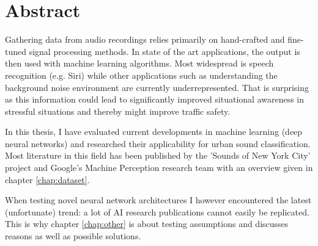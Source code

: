 \chapter*{Abstract}

\begin{center}
\begin{minipage}[t]{.8\textwidth}
\setlength{\parskip}{.5\baselineskip}


Gathering data from audio recordings relies primarily on hand-crafted and fine-tuned signal processing methods. In state of the art applications, the output is then used with machine learning algorithms. Most widespread is speech recognition (e.g. Siri) while other applications such as understanding the background noise environment are currently underrepresented. That is surprising as this information could lead to significantly improved situational awareness in stressful situations and thereby might improve traffic safety.


In this thesis, I have evaluated current developments in machine learning (deep neural networks) and researched their applicability for urban sound classification. Most literature in this field has been published by the 'Sounds of New York City' project and Google's Machine Perception research team with an overview given in chapter \ref{chap:dataset}.
 
When testing novel neural network architectures I however encountered the latest (unfortunate) trend: a lot of AI research publications cannot easily be replicated. This is why chapter \ref{chap:other} is about testing assumptions and discusses reasons as well as possible solutions.

\end{minipage}
\end{center}
